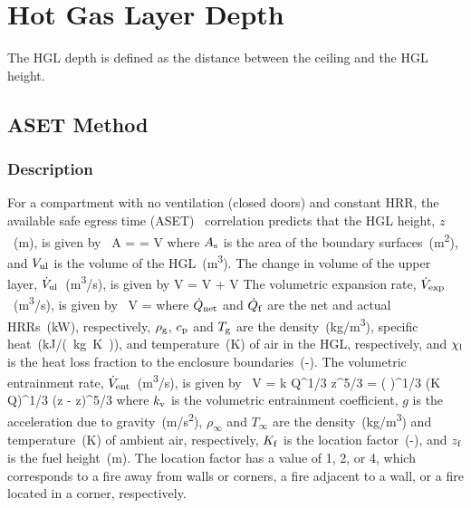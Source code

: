 
\chapter{Hot Gas Layer Depth}
\label{HGL_Depth_Chapter}

The HGL depth is defined as the distance between the ceiling and the HGL height.

\section{ASET Method}

\subsection*{Description}

For a compartment with no ventilation (closed doors) and constant HRR, the available safe egress time (ASET)~\cite{Walton:1}
correlation predicts that the HGL height, $z$~(\si{m}), is given by~\cite{SFPE:Milke}
\be
A  =  = \dot V
\label{eq:ASET_1}
\ee
where $A\sb{s}$ is the area of the boundary surfaces~(\si{m^2}), and $V\sb{ul}$ is the volume of the HGL~(\si{m^3}).
The change in volume of the upper layer, $\dot V\sb{ul}$~(\si{m^3/s}), is given by
\be
\dot V = \dot V + \dot V
\label{eq:ASET_2}
\ee
The volumetric expansion rate, $\dot V\sb{exp}$~(\si{m^3/s}), is given by~\cite{SFPE:Mowrer}
\be
\dot V =  \approx {}
\label{eq:ASET_3}
\ee
where $\dot Q\sb{net}$ and $\dot Q\sb{f}$ are the net and actual HRRs~(\si{kW}), respectively, $\rho\sb{g}$, $c\sb{p}$ and $T\sb{g}$ are the density~(\si{kg/m^3}), specific heat~(\si{kJ/(kg.K)}), and temperature~(\si{K}) of air in the HGL, respectively, and $\chi\sb{l}$ is the heat loss fraction to the enclosure boundaries~(-).
The volumetric entrainment rate, $\dot V\sb{ent}$~(\si{m^3/s}), is given by~\cite{Zukoski:1981}
\be
\dot V = k \dot Q^{1/3} z^{5/3} =  \left(  \right)^{1/3} (K \dot Q)^{1/3} (z - z)^{5/3}
\label{eq:ASET_4}
\ee
where $k\sb{v}$ is the volumetric entrainment coefficient, $g$ is the acceleration due to gravity~(\si{m/s^2}), $\rho_\infty$ and $T_\infty$ are the density~(\si{kg/m^3}) and temperature~(\si{K}) of ambient air, respectively, $K\sb{f}$ is the location factor~(-), and $z\sb{f}$ is the fuel height~(\si{m}). The location factor has a value of 1, 2, or 4, which corresponds to a fire away from walls or corners, a fire adjacent to a wall, or a fire located in a corner, respectively.

